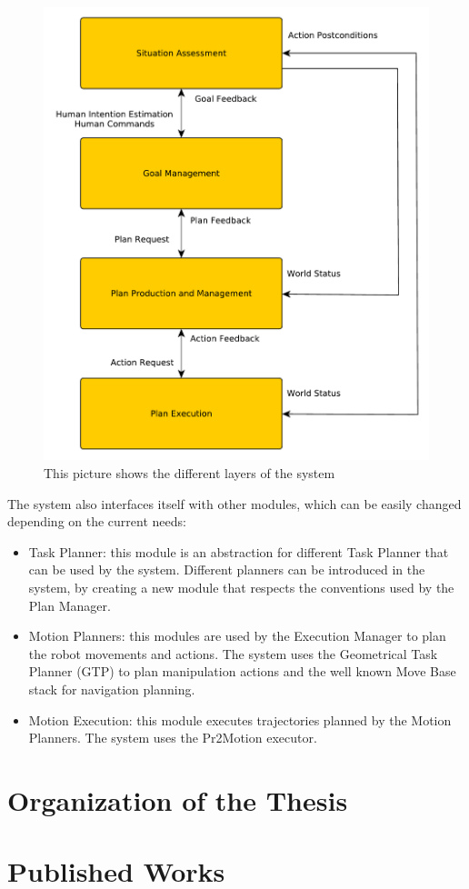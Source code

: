 \begin{figure}[h!]
	\centering
	\includegraphics[scale=0.45]{img/intro/system_architecture}
	\caption{This picture shows the different layers of the system}
	\label{fig:intro-system_architecture}
\end{figure}

The system also interfaces itself with other modules, which can be easily changed depending on the current needs:

\begin{itemize}
\item Task Planner: this module is an abstraction for different Task Planner that can be used by the system. Different planners can be introduced in the system, by creating a new module that respects the conventions used by the Plan Manager.
\item Motion Planners:  this modules are used by the Execution Manager to plan the robot movements and actions. The system uses the Geometrical Task Planner (GTP) to plan manipulation actions and the well known Move Base stack for navigation planning. 
\item Motion Execution: this module executes trajectories planned by the Motion Planners. The system uses the Pr2Motion executor.
\end{itemize}

\section{Organization of the Thesis}

\section{Published Works}